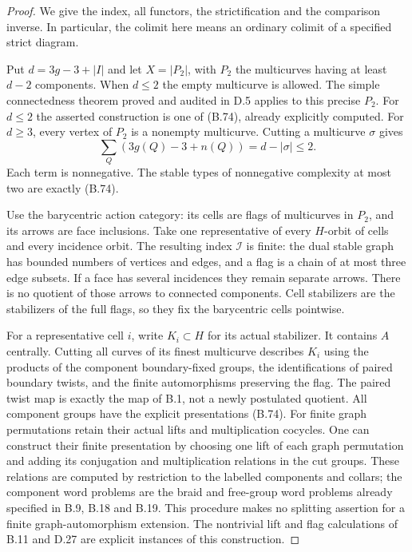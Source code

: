 \begin{proof}
We give the index, all functors, the strictification and the
comparison inverse.  In particular, the colimit here
means an ordinary colimit of a specified strict diagram.

Put $d=3g-3+|I|$ and let $X=|P_2|$, with $P_2$ the
multicurves having at least $d-2$ components.  When $d\leq2$
the empty multicurve is allowed.  The simple connectedness
theorem proved and audited in D.5 applies to this precise
$P_2$.  For $d\leq2$ the asserted construction is one of
(B.74), already explicitly computed.  For $d\geq3$, every
vertex of $P_2$ is a nonempty multicurve.  Cutting a multicurve
$\sigma$ gives
\[
 \sum_Q(3g(Q)-3+n(Q))=d-|\sigma|\leq2.             \tag{B.75}
\]
Each term is nonnegative.  The stable types of nonnegative
complexity at most two are exactly (B.74).

Use the barycentric action category: its cells are flags of
multicurves in $P_2$, and its arrows are face inclusions.
Take one representative of every $H$-orbit of cells and every
incidence orbit.  The resulting index $\mathcal I$ is finite:
the dual stable graph has bounded numbers of vertices and
edges, and a flag is a chain of at most three edge subsets.
If a face has several incidences they remain separate arrows.
There is no quotient of those arrows to connected components.
Cell stabilizers are the stabilizers of the full flags, so
they fix the barycentric cells pointwise.

For a representative cell $i$, write $K_i\subset H$ for
its actual stabilizer.  It contains $A$ centrally.  Cutting
all curves of its finest multicurve describes $K_i$ using
the products of the component boundary-fixed groups, the
identifications of paired boundary twists, and the finite
automorphisms preserving the flag.  The paired twist map
is exactly the map of B.1, not a newly postulated quotient.
All component groups have the explicit presentations (B.74).
For finite graph permutations retain their actual lifts and
multiplication cocycles.  One can construct their finite
presentation by choosing one lift of each graph permutation
and adding its conjugation and multiplication relations in
the cut groups.  These relations are computed by restriction
to the labelled components and collars; the component word
problems are the braid and free-group word problems already
specified in B.9, B.18 and B.19.  This procedure makes no
splitting assertion for a finite graph-automorphism extension.
The nontrivial lift and flag calculations of B.11 and D.27
are explicit instances of this construction.


\end{proof}
